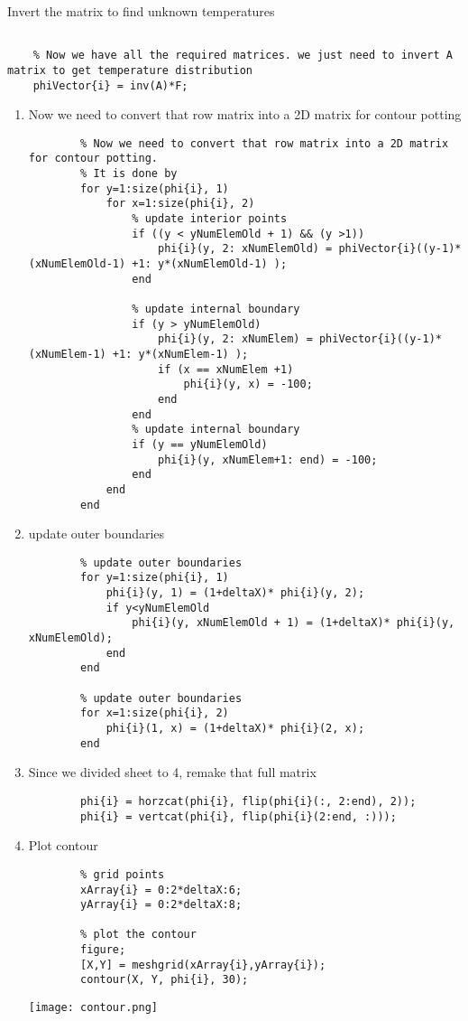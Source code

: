 \documentclass{article}
\begin{document}
Invert the matrix to find unknown temperatures\\
\begin{lstlisting}
    
    % Now we have all the required matrices. we just need to invert A matrix to get temperature distribution
    phiVector{i} = inv(A)*F;
\end{lstlisting}
\begin{enumerate}
    \item Now we need to convert that row matrix into a 2D matrix for contour potting\\
    \begin{lstlisting}
        % Now we need to convert that row matrix into a 2D matrix for contour potting.
        % It is done by
        for y=1:size(phi{i}, 1)
            for x=1:size(phi{i}, 2)
                % update interior points
                if ((y < yNumElemOld + 1) && (y >1))
                    phi{i}(y, 2: xNumElemOld) = phiVector{i}((y-1)*(xNumElemOld-1) +1: y*(xNumElemOld-1) );
                end

                % update internal boundary
                if (y > yNumElemOld)
                    phi{i}(y, 2: xNumElem) = phiVector{i}((y-1)*(xNumElem-1) +1: y*(xNumElem-1) );
                    if (x == xNumElem +1)
                        phi{i}(y, x) = -100;
                    end
                end
                % update internal boundary
                if (y == yNumElemOld)
                    phi{i}(y, xNumElem+1: end) = -100;
                end
            end
        end

    \end{lstlisting}
    \item update outer boundaries\\
    \begin{lstlisting}
        % update outer boundaries
        for y=1:size(phi{i}, 1)
            phi{i}(y, 1) = (1+deltaX)* phi{i}(y, 2);
            if y<yNumElemOld
                phi{i}(y, xNumElemOld + 1) = (1+deltaX)* phi{i}(y, xNumElemOld);
            end
        end

        % update outer boundaries
        for x=1:size(phi{i}, 2)
            phi{i}(1, x) = (1+deltaX)* phi{i}(2, x);
        end
    \end{lstlisting}
    \item Since we divided sheet to 4, remake that full matrix\\
    \begin{lstlisting}
        phi{i} = horzcat(phi{i}, flip(phi{i}(:, 2:end), 2));
        phi{i} = vertcat(phi{i}, flip(phi{i}(2:end, :)));
    \end{lstlisting}
    \item Plot contour
    \begin{lstlisting}
        % grid points
        xArray{i} = 0:2*deltaX:6;
        yArray{i} = 0:2*deltaX:8;

        % plot the contour
        figure;
        [X,Y] = meshgrid(xArray{i},yArray{i});
        contour(X, Y, phi{i}, 30);
    \end{lstlisting}
    \centerline{\texttt{[image: contour.png]}}

\end{enumerate}


    
\end{document}
